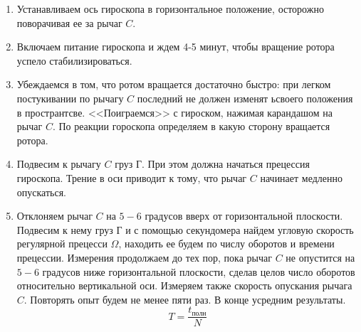\documentclass[a4paper,12pt]{article}
\begin{document}
\begin{enumerate}
	\item Устанавливаем ось гироскопа в горизонтальное положение, осторожно поворачивая ее за рычаг $C$.
	\item Включаем питание гироскопа и ждем 4-5 минут, чтобы вращение ротора успело стабилизироваться.
	\item Убеждаемся в том, что ротом вращается достаточно быстро: при легком постукивании по рычагу $C$ последний не должен изменят ьсвоего положения в пространтсве. <<Поиграемся>> с гироском, нажимая карандашом на рычаг $C$. По реакции гороскопа определяем в какую сторону вращается ротора.
	\item Подвесим к рычагу $C$ груз $\text{Г}$. При этом должна начаться прецессия гироскопа. Трение в оси приводит к тому, что рычаг $C$ начинает медленно опускаться.
	\item Отклоняем рычаг $C$ на $5-6$ градусов вверх от горизонтальной плоскости. Подвесим к нему груз $\text{Г}$ и с помощью секундомера найдем угловую скорость регулярной прецесси $\Omega$, находить ее будем по числу оборотов и времени прецессии. Измерения продолжаем до тех пор, пока рычаг $C$  не опустится на $5-6$ градусов ниже горизонтальной плоскости, сделав целов число оборотов относительно вертикальной оси. Измеряем также скорость опускания рычага $C$. Повторять опыт будем не менее пяти раз. В конце усредним результаты.
	$$
		T = \frac{t_{\text{полн}}}{N}
	$$
	

\end{enumerate}
\end{document}
